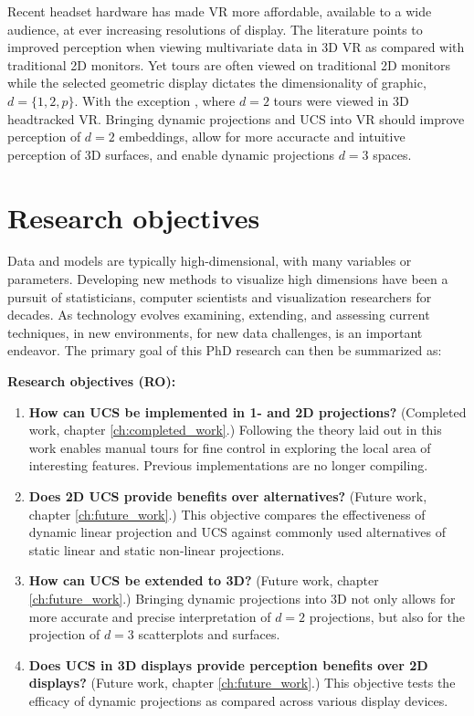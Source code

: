 \documentclass{monashthesis}
\begin{document}
Recent headset hardware has made VR more affordable, available to a wide
audience, at ever increasing resolutions of display. The literature
points to improved perception when viewing multivariate data in 3D VR as
compared with traditional 2D monitors. Yet tours are often viewed on
traditional 2D monitors while the selected geometric display dictates
the dimensionality of graphic, \(d=\{1, 2, p\}\). With the exception
\textcite{nelson_xgobi_1998}, where \(d=2\) tours were viewed in 3D
headtracked VR. Bringing dynamic projections and UCS into VR should
improve perception of \(d=2\) embeddings, allow for more accuracte and
intuitive perception of 3D surfaces, and enable dynamic projections
\(d=3\) spaces.

\section{Research objectives}\label{research-objectives}

Data and models are typically high-dimensional, with many variables or
parameters. Developing new methods to visualize high dimensions have
been a pursuit of statisticians, computer scientists and visualization
researchers for decades. As technology evolves examining, extending, and
assessing current techniques, in new environments, for new data
challenges, is an important endeavor. The primary goal of this PhD
research can then be summarized as:

\textbf{Research objectives (RO):}

\begin{enumerate}
\def\labelenumi{\arabic{enumi}.}
\tightlist
\item
  \textbf{How can UCS be implemented in 1- and 2D projections?}
  (Completed work, chapter \ref{ch:completed_work}.) Following the
  theory laid out in \textcite{cook_manual_1997} this work enables
  manual tours for fine control in exploring the local area of
  interesting features. Previous implementations are no longer
  compiling. 
\item
  \textbf{Does 2D UCS provide benefits over alternatives?} (Future work,
  chapter \ref{ch:future_work}.) This objective compares the
  effectiveness of dynamic linear projection and UCS against commonly
  used alternatives of static linear and static non-linear projections. 
\item
  \textbf{How can UCS be extended to 3D?} (Future work, chapter
  \ref{ch:future_work}.) Bringing dynamic projections into 3D not only
  allows for more accurate and precise interpretation of \(d=2\)
  projections, but also for the projection of \(d=3\) scatterplots and
  surfaces. 
\item
  \textbf{Does UCS in 3D displays provide perception benefits over 2D
  displays?} (Future work, chapter \ref{ch:future_work}.) This objective
  tests the efficacy of dynamic projections as compared across various
  display devices. 
\end{enumerate}
\end{document}
